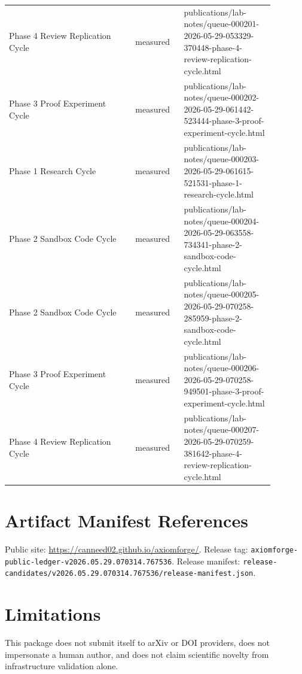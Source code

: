 \documentclass[11pt]{article}
\begin{document}
\begin{longtable}{p{0.42\linewidth}p{0.16\linewidth}p{0.30\linewidth}}
Phase 4 Review Replication Cycle & measured & publications/lab-notes/queue-000201-2026-05-29-053329-370448-phase-4-review-replication-cycle.html \\
Phase 3 Proof Experiment Cycle & measured & publications/lab-notes/queue-000202-2026-05-29-061442-523444-phase-3-proof-experiment-cycle.html \\
Phase 1 Research Cycle & measured & publications/lab-notes/queue-000203-2026-05-29-061615-521531-phase-1-research-cycle.html \\
Phase 2 Sandbox Code Cycle & measured & publications/lab-notes/queue-000204-2026-05-29-063558-734341-phase-2-sandbox-code-cycle.html \\
Phase 2 Sandbox Code Cycle & measured & publications/lab-notes/queue-000205-2026-05-29-070258-285959-phase-2-sandbox-code-cycle.html \\
Phase 3 Proof Experiment Cycle & measured & publications/lab-notes/queue-000206-2026-05-29-070258-949501-phase-3-proof-experiment-cycle.html \\
Phase 4 Review Replication Cycle & measured & publications/lab-notes/queue-000207-2026-05-29-070259-381642-phase-4-review-replication-cycle.html \\
\end{longtable}

\section*{Artifact Manifest References}
Public site: \url{https://canneed02.github.io/axiomforge/}. Release tag:
\texttt{axiomforge-public-ledger-v2026.05.29.070314.767536}.
Release manifest:
\texttt{release-candidates/v2026.05.29.070314.767536/release-manifest.json}.

\section*{Limitations}
This package does not submit itself to arXiv or DOI providers, does not
impersonate a human author, and does not claim scientific novelty from
infrastructure validation alone.



\end{document}
